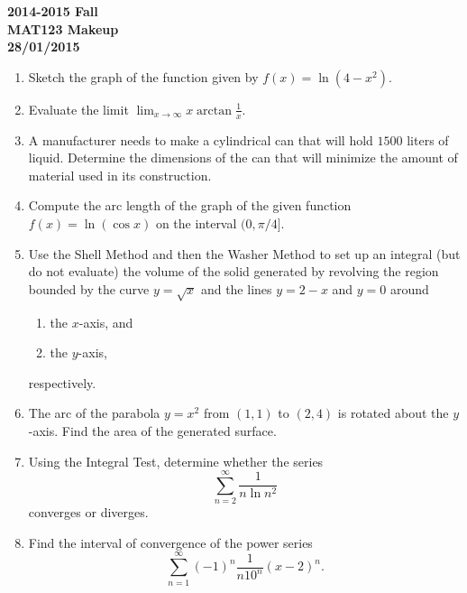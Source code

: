 \documentclass[a4paper, 12pt]{article}
\renewcommand{\headrulewidth}{0pt}
\begin{document}
\pagestyle{empty}

\begin{center}
\textbf{2014-2015 Fall\\MAT123 Makeup\\28/01/2015}
\end{center}

\begin{enumerate}[leftmargin=*,label=\textbf{\arabic*.}]
\item Sketch the graph of the function given by $f(x)=\ln\left(4-x^2\right)$.

\item Evaluate the limit $\displaystyle\lim_{x\to\infty}x\arctan\frac1x$.

\item A manufacturer needs to make a cylindrical can that will hold $1500$ liters of liquid. Determine the dimensions of the can that will minimize the amount of material used in its construction.

\item Compute the arc length of the graph of the given function $f(x)=\ln(\cos x)$ on the interval $(0,\pi/4]$.

\item Use the Shell Method and then the Washer Method to set up an integral (but do not evaluate) the volume of the solid generated by revolving the region bounded by the curve $y=\sqrt x$ and the lines $y=2-x$ and $y=0$ around
\begin{enumerate}[leftmargin=*,label=\textbf{\alph*.}]
\item the $x$-axis, and
\item the $y$-axis,
\end{enumerate}
respectively.

\item The arc of the parabola $y=x^2$ from $(1,1)$ to $(2,4)$ is rotated about the $y$-axis. Find the area of the generated surface.

\item Using the Integral Test, determine whether the series
\[\displaystyle\sum_{n=2}^{\infty}\frac1{n\ln n^2}\]
converges or diverges.

\item Find the interval of convergence of the power series
\[\displaystyle\sum_{n=1}^\infty(-1)^n\frac1{n10^n}(x-2)^n.\]

\end{enumerate}

\newpage
\pagestyle{fancy}
\renewcommand{\headrulewidth}{1pt}
\end{document}
